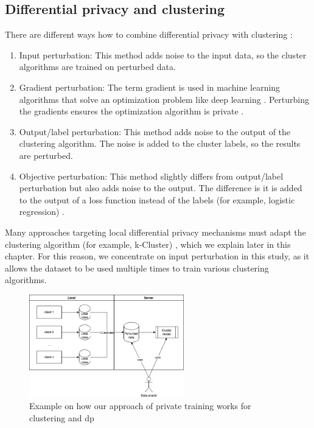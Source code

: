 \subsection{Differential privacy and clustering} \label{theory:literature-review:dp-clustering}
There are different ways how to combine differential privacy with clustering \citep{baraheem_survey_2022}:
\begin{enumerate}
  \item Input perturbation: This method adds noise to the input data, so the cluster algorithms are trained on perturbed data.
  \item Gradient perturbation: The term gradient is used in machine learning algorithms that solve an optimization problem like deep learning \citep{hassan_differential_2019}.
        Perturbing the gradients ensures the optimization algorithm is private \citep{ji_differential_2014}.
  \item Output/label perturbation: This method adds noise to the output of the clustering algorithm.
        The noise is added to the cluster labels, so the results are perturbed.
  \item Objective perturbation: This method slightly differs from output/label perturbation but also adds noise to the output.
        The difference is it is added to the output of a loss function instead of the labels (for example, logistic regression) \citep{baraheem_survey_2022}.
\end{enumerate}
Many approaches targeting local differential privacy mechanisms must adapt the clustering algorithm (for example, k-Cluster) \citep{sun_distributed_2019}, which we explain later in this chapter.
For this reason, we concentrate on input perturbation in this study, as it allows the dataset to be used multiple times to train various clustering algorithms.
\begin{figure}[ht]
  \includegraphics[width=0.6\textwidth]{./TheorethicalFramework/ND-Laplace/Images/overview-clustering&dp.png}
  \caption{Example on how our approach of private training works for clustering and \gls{dp}}
  \label{fig:overview-clustering-and-dp}
\end{figure}
